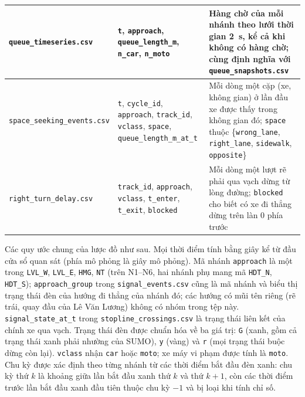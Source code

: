\documentclass[../main.tex]{subfiles}
\begin{document}
\begin{table}[!htbp]
\begin{tabular}{|p{3.7cm}|p{5.1cm}|p{4.2cm}|}
\texttt{queue\_\allowbreak timeseries.csv} & \texttt{t}, \texttt{approach}, \texttt{queue\_\allowbreak length\_\allowbreak m}, \texttt{n\_\allowbreak car}, \texttt{n\_\allowbreak moto} & Hàng chờ của mỗi nhánh theo lưới thời gian 2~s, kể cả khi không có hàng chờ; cùng định nghĩa với \texttt{queue\_\allowbreak snapshots.csv} \\ \hline
\texttt{space\_\allowbreak seeking\_\allowbreak events.csv} & \texttt{t}, \texttt{cycle\_\allowbreak id}, \texttt{approach}, \texttt{track\_\allowbreak id}, \texttt{vclass}, \texttt{space}, \texttt{queue\_\allowbreak length\_\allowbreak m\_\allowbreak at\_\allowbreak t} & Mỗi dòng một cặp (xe, không gian) ở lần đầu xe được thấy trong không gian đó; \texttt{space} thuộc \{\texttt{wrong\_\allowbreak lane}, \texttt{right\_\allowbreak lane}, \texttt{sidewalk}, \texttt{opposite}\} \\ \hline
\texttt{right\_\allowbreak turn\_\allowbreak delay.csv} & \texttt{track\_\allowbreak id}, \texttt{approach}, \texttt{vclass}, \texttt{t\_\allowbreak enter}, \texttt{t\_\allowbreak exit}, \texttt{blocked} & Mỗi dòng một lượt rẽ phải qua vạch dừng từ lòng đường; \texttt{blocked} cho biết có xe đi thẳng dừng trên làn 0 phía trước \\ \hline
\end{tabular}
\end{table}

\begin{sloppypar}
Các quy ước chung của lược đồ như sau. Mọi thời điểm tính bằng giây kể từ đầu cửa sổ quan sát (phía mô phỏng là giây mô phỏng). Mã nhánh \texttt{approach} là một trong \texttt{LVL\_W}, \texttt{LVL\_E}, \texttt{HMG}, \texttt{NT} (trên N1--N6, hai nhánh phụ mang mã \texttt{HDT\_N}, \texttt{HDT\_S}); \texttt{approach\_group} trong \texttt{signal\_events.csv} cũng là mã nhánh và biểu thị trạng thái đèn của hướng đi thẳng của nhánh đó; các hướng có mũi tên riêng (rẽ trái, quay đầu của Lê Văn Lương) không có nhóm trong tệp này. \texttt{signal\_state\_at\_t} trong \texttt{stopline\_crossings.csv} là trạng thái liên kết của chính xe qua vạch. Trạng thái đèn được chuẩn hóa về ba giá trị: \texttt{G} (xanh, gồm cả trạng thái xanh phải nhường của SUMO), \texttt{y} (vàng) và \texttt{r} (mọi trạng thái buộc dừng còn lại). \texttt{vclass} nhận \texttt{car} hoặc \texttt{moto}; xe máy vi phạm được tính là \texttt{moto}. Chu kỳ được xác định theo từng nhánh từ các thời điểm bắt đầu đèn xanh: chu kỳ thứ $k$ là khoảng giữa lần bắt đầu xanh thứ $k$ và thứ $k+1$, còn các thời điểm trước lần bắt đầu xanh đầu tiên thuộc chu kỳ $-1$ và bị loại khi tính chỉ số.
\end{sloppypar}
\end{document}
